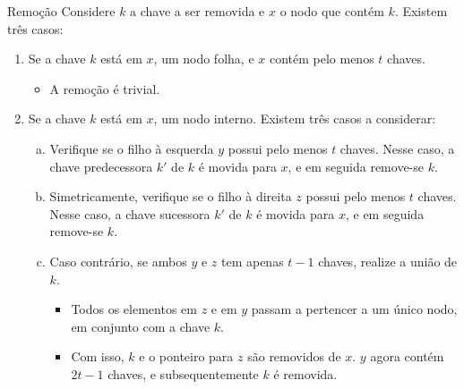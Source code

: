 \documentclass[aspectratio=169]{beamer}
\begin{document}
\begin{frame}{Remoção}
Considere $k$ a chave a ser removida e $x$ o nodo que contém $k$. Existem três casos:
 \begin{enumerate}[(1)]
  \item Se a chave $k$ está em $x$, um nodo folha, e $x$ contém pelo menos $t$ chaves. 
  \begin{itemize}
  \item A remoção é trivial.
  \end{itemize}
  \item Se a chave $k$ está em $x$, um nodo interno. Existem três casos a considerar:
  \begin{enumerate}[(a)]
  \item Verifique se o filho à esquerda $y$ possui pelo menos $t$ chaves. Nesse caso, a chave predecessora $k'$ de $k$ é movida para $x$, e em seguida remove-se $k$.
  \item Simetricamente, verifique se o filho à direita $z$ possui pelo menos $t$ chaves. Nesse caso, a chave sucessora $k'$ de $k$ é movida para $x$, e em seguida remove-se $k$. 
  \item Caso contrário, se ambos $y$ e $z$  tem apenas $t-1$ chaves, realize a união de $k$.
  \begin{itemize}
  \item Todos os elementos em $z$ e em $y$ passam a pertencer a um único nodo, em conjunto com a chave $k$. 
  \item Com isso, $k$ e o ponteiro para $z$ são removidos de $x$. $y$ agora contém $2t-1$ chaves, e subsequentemente $k$ é removida.
  \end{itemize} 
  \end{enumerate} 
 \end{enumerate}
\end{frame}

\end{document}
